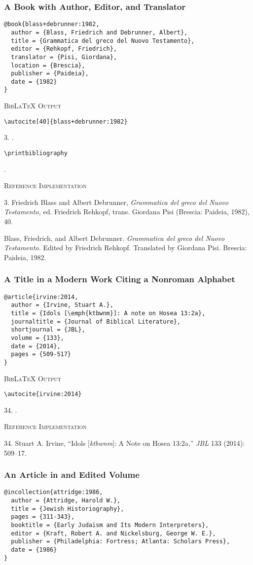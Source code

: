 \documentclass[a4paper]{article}
\newcommand\citetestns[3]{%
  {\textsc{BibLaTeX Output}\par
   \nobreak
   \texttt{\textbackslash autocite[#2]\{#3\}}\par
   \color{biblatex-colour}
   #1. \cite[#2]{#3}.\par
   \color{black}
   \texttt{\textbackslash printbibliography}\par
   \color{biblatex-colour}
   \sloppy\hangindent\bibindent\bibentrycite{#3}.\par}}
\newcommand\citetestnsnpnb[2]{%
  {\textsc{BibLaTeX Output}\par
   \nobreak
   \texttt{\textbackslash autocite\{#2\}}\par
   \color{biblatex-colour}
   #1. \cite{#2}.\par}}
\newenvironment{refimp}{%
  \begin{minipage}{\linewidth}
    \setlength{\parskip}{1ex}
    \textsc{Reference Implementation}\par
    \nobreak
    \color{reference-colour}
}{\end{minipage}}
\begin{document}
\subsubsection{A Book with Author, Editor, and Translator}

\begin{lstlisting}
@book{blass+debrunner:1982,
  author = {Blass, Friedrich and Debrunner, Albert},
  title = {Grammatica del greco del Nuovo Testamento},
  editor = {Rehkopf, Friedrich},
  translator = {Pisi, Giordana},
  location = {Brescia},
  publisher = {Paideia},
  date = {1982}
}
\end{lstlisting}  

\citetestns{3}{40}{blass+debrunner:1982}

\begin{refimp}
  3. Friedrich Blass and Albert Debrunner, \emph{Grammatica del greco del
  Nuovo Testamento,} ed. Friedrich Rehkopf, trans. Giordana Pisi (Brescia:
  Paideia, 1982), 40.

  \hangindent\bibindent Blass, Friedrich, and Albert Debrunner.
  \emph{Grammatica del greco del Nuovo Testamento.} Edited by Friedrich
  Rehkopf. Translated by Giordana Pisi. Brescia: Paideia, 1982.
\end{refimp}

\subsubsection{A Title in a Modern Work Citing a Nonroman Alphabet}

\begin{lstlisting}
@article{irvine:2014,
  author = {Irvine, Stuart A.},
  title = {Idols [\emph{ktbwnm}]: A note on Hosea 13:2a},
  journaltitle = {Journal of Biblical Literature},
  shortjournal = {JBL},
  volume = {133},
  date = {2014},
  pages = {509-517}
}
\end{lstlisting}

\citetestnsnpnb{34}{irvine:2014}

\begin{refimp}
  34. Stuart A. Irvine, “Idols [\emph{ktbwnm}]: A Note on Hosea 13:2a,”
  \emph{JBL} 133 (2014): 509–17.
\end{refimp}

\subsubsection{An Article in and Edited Volume}

\begin{lstlisting}
@incollection{attridge:1986,
  author = {Attridge, Harold W.},
  title = {Jewish Historiography},
  pages = {311-343},
  booktitle = {Early Judaism and Its Modern Interpreters},
  editor = {Kraft, Robert A. and Nickelsburg, George W. E.},
  publisher = {Philadelphia: Fortress; Atlanta: Scholars Press},
  date = {1986}
}
\end{lstlisting}  
\end{document}
